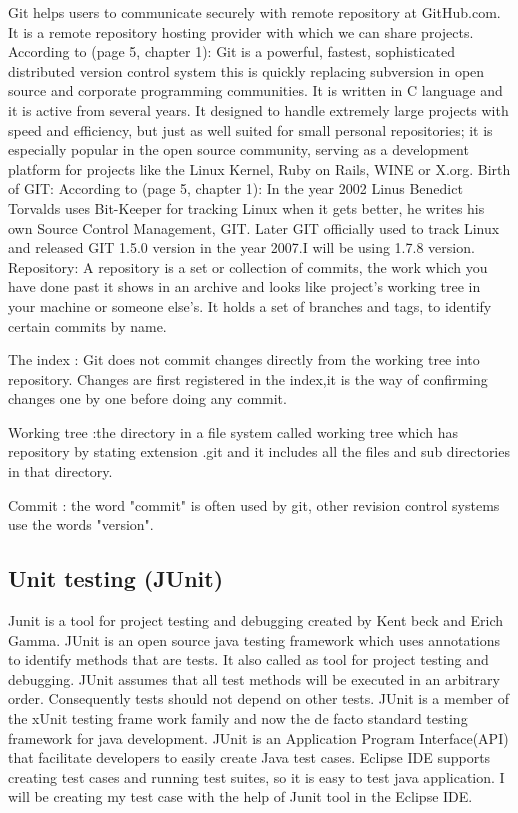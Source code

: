 \documentclass{article}
\begin{document}
Git helps users to communicate securely with remote repository at GitHub.com. It is a remote repository hosting provider with which we can share projects.	 
According to \cite{Chacon2011ProGit} (page 5, chapter 1): Git is a powerful, fastest, sophisticated distributed version control system this is quickly replacing subversion in open source and corporate programming communities. It is written in C language and it is active from several years. It designed to handle extremely large projects with speed and efficiency,	but just as well suited for small personal repositories; it is especially popular in the open source community, serving as a development platform for projects like the Linux Kernel, Ruby on Rails, WINE or X.org. 
Birth of GIT:
According to \cite{Chacon2011ProGit}(page 5, chapter 1): In the year 2002 Linus Benedict Torvalds uses Bit-Keeper for tracking Linux when it gets better, he writes his own Source Control Management, GIT. Later GIT officially used to track Linux and released GIT 1.5.0 version in the year 2007.I will be using 1.7.8 version. 
Repository:  A repository is a set or collection of commits, the work which you have done past it shows in an archive and looks like project's working tree in your machine or someone else's. It holds a set of branches and tags, to identify certain commits by name.

The index : Git does not commit changes directly from the working tree into repository. Changes are first registered in the index,it is the way of confirming changes one by one before doing any commit.																										

Working tree :the directory in a file system called working tree which has repository by stating extension .git and it includes all the files and sub directories in that  directory.

Commit : the word "commit" is often used by git, other revision control systems use the words "version".


\subsection{Unit testing (JUnit)}
\label{sec:junit}


Junit is a tool for project testing and debugging created by Kent beck and Erich Gamma.
JUnit is an open source java testing framework which uses annotations to identify methods that are tests. It also called as tool for project testing and debugging. JUnit assumes that all test methods will be executed in an arbitrary order. Consequently tests should not depend on other tests.
JUnit is a member of the xUnit testing frame work family and now the de facto standard testing framework for java development. JUnit is an Application Program Interface(API) that facilitate developers to easily create Java test cases. 
Eclipse IDE supports creating test cases and running test suites, so it is easy to test java application.
I will be creating my test case with the help of Junit tool in the Eclipse IDE. 
\end{document}
